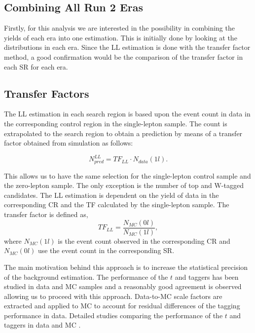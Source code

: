 \subsection{Combining All Run 2 Eras}\label{sec:LLCombination}
Firstly, for this analysis we are interested in the possibility in combining the yields of each era into one estimation. This is initially done by looking at the \met{} distributions in each era. Since the LL estimation is done with the transfer factor method, a good confirmation would be the comparison of the transfer factor in each SR for each era. 


\subsection{Transfer Factors}
\label{subsec:TF}

The LL estimation in each search region is based upon the event count in data in the corresponding control region in the single-lepton sample. The count is extrapolated to the search region to obtain a prediction by means of a transfer factor obtained from simulation as follows: 

\begin{equation}
\label{eqn:LLTF}
N_{pred}^{LL}=TF_{LL} \cdot N_{data}(1l).
\end{equation}

This allows us to have the same selection for the single-lepton control sample and the zero-lepton sample. The only exception is the number of top and W-tagged candidates. The LL estimation is dependent on the yield of data in the corresponding CR and the TF calculated by the single-lepton sample. The transfer factor is defined as, 
\begin{equation}
\label{eqn:TF}
TF_{LL}=\frac{N_{MC}(0l)}{N_{MC}(1l)},
\end{equation}
where $N_{MC}(1l)$ is the event count observed in the corresponding CR and $N_{MC}(0l)$ use the event count in the corresponding SR. 

The main motivation behind this approach is to increase the statistical precision of the background estimation. The performance of the $t$ and \W{} taggers has been studied in data and MC samples and a reasonably good agreement is observed allowing us to proceed with this approach. Data-to-MC scale factors are extracted and applied to MC to account for residual differences of the tagging performance in data. Detailed studies comparing the performance of the $t$ and \W{} taggers in data and MC \cite{noauthor_search_nodate}.

